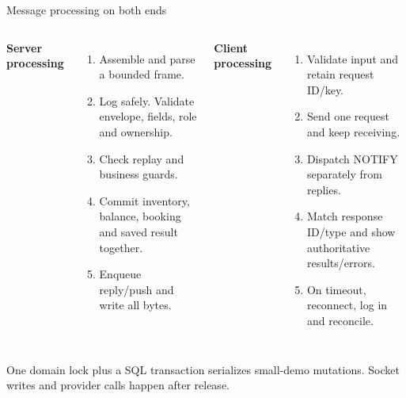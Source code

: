 \documentclass[t,aspectratio=169]{beamer}
\newcommand{\lead}[1]{\textcolor{hustprimary}{\textbf{#1}}}
\newcommand{\gap}{\par\vspace{0.18cm}}
\begin{document}
\begin{frame}{Message processing on both ends}
\small
\begin{columns}[T]
\lead{Server processing}
\begin{enumerate}\setlength{\itemsep}{5pt}
\item Assemble and parse a bounded frame.
\item Log safely. Validate envelope, fields, role and ownership.
\item Check replay and business guards.
\item Commit inventory, balance, booking and saved result together.
\item Enqueue reply/push and write all bytes.
\end{enumerate}
\lead{Client processing}
\begin{enumerate}\setlength{\itemsep}{5pt}
\item Validate input and retain request ID/key.
\item Send one request and keep receiving.
\item Dispatch NOTIFY separately from replies.
\item Match response ID/type and show authoritative results/errors.
\item On timeout, reconnect, log in and reconcile.
\end{enumerate}
\end{columns}
\gap
One domain lock plus a SQL transaction serializes small-demo mutations. Socket writes and provider calls happen after release.
\end{frame}
\end{document}
